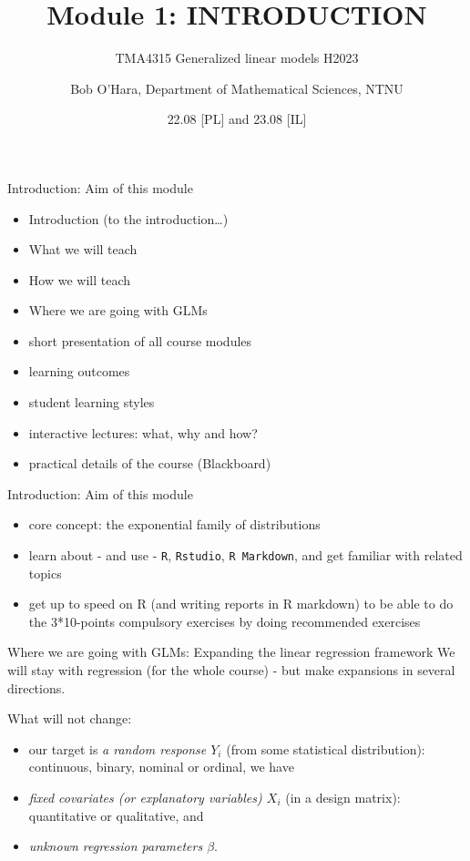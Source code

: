 \documentclass[
  ignorenonframetext,
]{beamer}
\title{Module 1: INTRODUCTION}
\subtitle{TMA4315 Generalized linear models H2023}
\author{Bob O'Hara, Department of Mathematical Sciences, NTNU}
\date{22.08 {[}PL{]} and 23.08 {[}IL{]}}
\providecommand{\tightlist}{%
  \setlength{\itemsep}{0pt}\setlength{\parskip}{0pt}}
\begin{document}
\frame{\titlepage}

\begin{frame}{Introduction: Aim of this module}
\protect\hypertarget{introduction-aim-of-this-module}{}
\begin{itemize}
\item
  Introduction (to the introduction\ldots)
\item
  What we will teach
\item
  How we will teach
\item
  Where we are going with GLMs
\item
  short presentation of all course modules
\item
  learning outcomes
\item
  student learning styles
\item
  interactive lectures: what, why and how?
\item
  practical details of the course (Blackboard)
\end{itemize}
\end{frame}

\begin{frame}[fragile]{Introduction: Aim of this module}
\protect\hypertarget{introduction-aim-of-this-module-1}{}
\begin{itemize}
\tightlist
\item
  core concept: the exponential family of distributions
\item
  learn about - and use - \texttt{R}, \texttt{Rstudio},
  \texttt{R\ Markdown}, and get familiar with related topics
\item
  get up to speed on R (and writing reports in R markdown) to be able to
  do the 3*10-points compulsory exercises by doing recommended exercises
\end{itemize}
\end{frame}

\begin{frame}
\begin{block}{Where we are going with GLMs: Expanding the linear
regression framework}
\protect\hypertarget{where-we-are-going-with-glms-expanding-the-linear-regression-framework}{}
We will stay with regression (for the whole course) - but make
expansions in several directions.

What will not change:

\begin{itemize}
\item
  our target is \emph{a random response \(Y_i\)} (from some statistical
  distribution): continuous, binary, nominal or ordinal, we have
\item
  \emph{fixed covariates (or explanatory variables) \(X_i\)} (in a
  design matrix): quantitative or qualitative, and
\item
  \emph{unknown regression parameters \(\beta\)}.
\end{itemize}
\end{block}
\end{frame}
\end{document}
